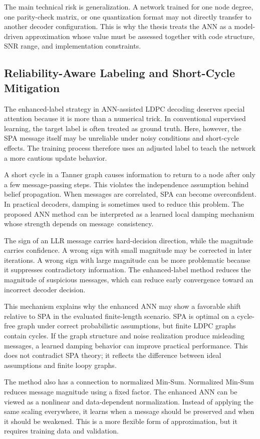 The main technical risk is generalization. A network trained for one node degree, one parity-check matrix, or one quantization format may not directly transfer to another decoder configuration. This is why the thesis treats the ANN as a model-driven approximation whose value must be assessed together with code structure, SNR range, and implementation constraints.

\subsection{Reliability-Aware Labeling and Short-Cycle Mitigation}
The enhanced-label strategy in ANN-assisted LDPC decoding deserves special attention because it is more than a numerical trick. In conventional supervised learning, the target label is often treated as ground truth. Here, however, the SPA message itself may be unreliable under noisy conditions and short-cycle effects. The training process therefore uses an adjusted label to teach the network a more cautious update behavior.

A short cycle in a Tanner graph causes information to return to a node after only a few message-passing steps. This violates the independence assumption behind belief propagation. When messages are correlated, SPA can become overconfident. In practical decoders, damping is sometimes used to reduce this problem. The proposed ANN method can be interpreted as a learned local damping mechanism whose strength depends on message~consistency.

The sign of an LLR message carries hard-decision direction, while the magnitude carries confidence. A wrong sign with small magnitude may be corrected in later iterations. A wrong sign with large magnitude can be more problematic because it suppresses contradictory information. The enhanced-label method reduces the magnitude of suspicious messages, which can reduce early convergence toward an incorrect decoder decision.

This mechanism explains why the enhanced ANN may show a favorable shift relative to SPA in the evaluated finite-length scenario. SPA is optimal on a cycle-free graph under correct probabilistic assumptions, but finite LDPC graphs contain cycles. If the graph structure and noise realization produce misleading messages, a learned damping behavior can improve practical performance. This does not contradict SPA theory; it reflects the difference between ideal assumptions and finite loopy graphs.

The method also has a connection to normalized Min-Sum. Normalized Min-Sum reduces message magnitude using a fixed factor. The enhanced ANN can be viewed as a nonlinear and data-dependent normalization. Instead of applying the same scaling everywhere, it learns when a message should be preserved and when it should be weakened. This is a more flexible form of approximation, but it requires training data and validation.

